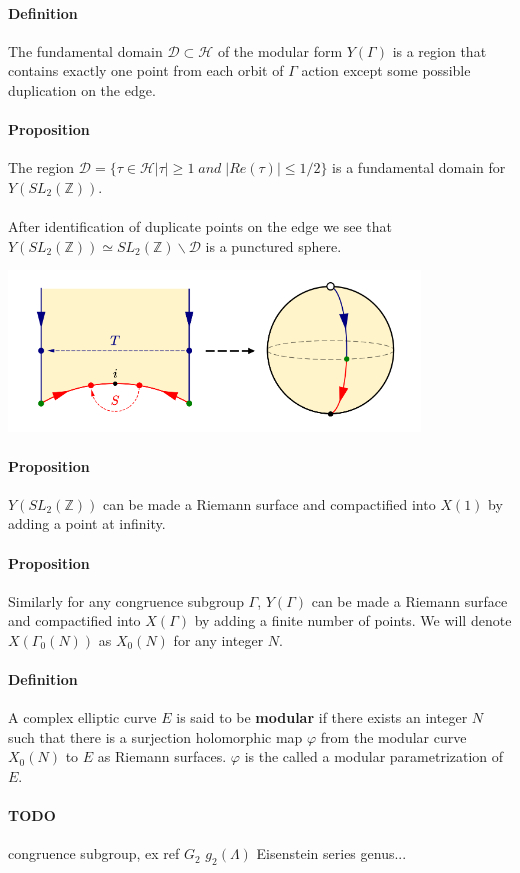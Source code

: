 \documentclass[letterpaper,10pt]{article}
\begin{document}
\paragraph{Definition } The fundamental domain $\mathcal{D} \subset \mathcal{H}$ of the modular form $Y(\Gamma)$ is
a region that contains exactly one point from each orbit of $\Gamma$ action except some
possible duplication on the edge.

\paragraph{Proposition} The region $\mathcal{D} = \{ \tau \in \mathcal{H}  |\tau| \geq 1 \; and \; |Re(\tau)| \leq 1/2\}$ is a fundamental domain for $Y(SL_2(\mathbb{Z}))$.

{\itshape \paragraph{} After identification of duplicate points on the edge we see that $Y(SL_2(\mathbb{Z})) \simeq SL_2(\mathbb{Z})\backslash \mathcal{D}$ is a punctured sphere.
}

\includegraphics[scale=1.0]{sphere}

\paragraph{Proposition}  $Y(SL_2(\mathbb{Z}))$ can be made a Riemann surface and compactified into $X(1)$ by adding a point at infinity.



\paragraph{Proposition} Similarly for any congruence subgroup $\Gamma$, $Y(\Gamma)$ can be made a Riemann surface and compactified into $X(\Gamma)$
 by adding a finite number of points. We will denote $X(\Gamma_0(N))$ as $X_0(N)$ for any integer $N$. 

\paragraph{Definition} A complex elliptic curve $E$ is said to be \textbf{modular} if there exists an integer $N$ such that there is a surjection holomorphic map $\varphi$ 
from the modular curve $X_0(N)$ to $E$ as Riemann surfaces. $\varphi$ is the called a modular parametrization of $E$.

\paragraph{TODO} congruence subgroup, ex ref \cite{zhou} $G_2$ $g_2(\Lambda)$ Eisenstein series genus...


\printbibliography %
\end{document}
